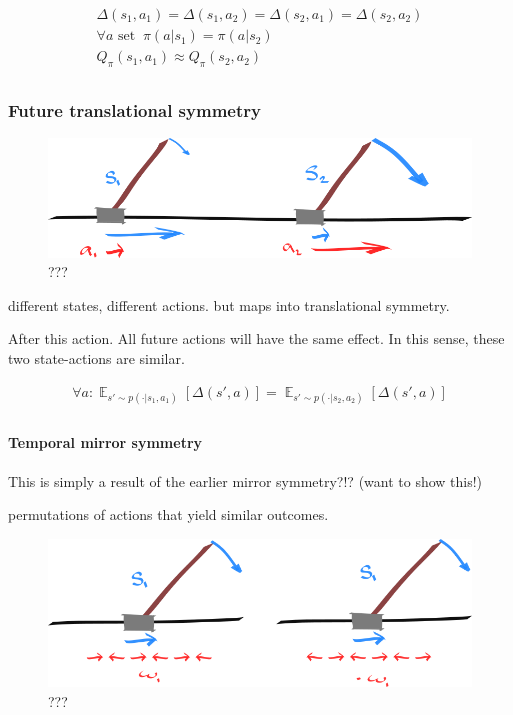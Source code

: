 \begin{align}
\Delta(s_1, a_1) = \Delta(s_1, a_2) = \Delta(s_2, a_1) = \Delta(s_2, a_2) \\
\forall a \text{ set}\;\;\pi(a | s_1) = \pi(a| s_2) \\
Q_\pi(s_1, a_1) \approx Q_\pi(s_2, a_2)  \\
\end{align}

\hypertarget{future-translational-symmetry}{%
\subsubsection{Future translational
symmetry}\label{future-translational-symmetry}}

\begin{figure}
\centering
\includegraphics[width=1\textwidth,height=0.25\textheight]{../../pictures/drawings/cart-pole-state.png}
\caption{???}
\end{figure}

different states, different actions. but maps into translational
symmetry.

After this action. All future actions will have the same effect. In this
sense, these two state-actions are similar.

\begin{align}
\forall a: \mathop{\mathbb E}_{s' \sim p(\cdot| s_1, a_1)} [\Delta(s', a)] =  \mathop{\mathbb E}_{s' \sim p(\cdot| s_2, a_2)} [\Delta(s', a)] \\
\end{align}

\hypertarget{temporal-mirror-symmetry}{%
\paragraph{Temporal mirror symmetry}\label{temporal-mirror-symmetry}}

This is simply a result of the earlier mirror symmetry?!? (want to show
this!)

permutations of actions that yield similar outcomes.

\begin{figure}
\centering
\includegraphics[width=1\textwidth,height=0.25\textheight]{../../pictures/drawings/cart-pole-temporal-mirror.png}
\caption{???}
\end{figure}


